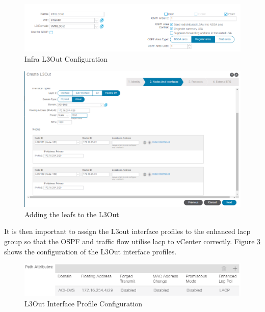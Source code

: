 \begin{figure}[H]
    
    \centering
    \includegraphics[scale=0.6]{images/InfraL3Out.png}
    
    \caption{Infra L3Out Configuration}
    \label{fig:l3out}
\end{figure}

\begin{figure}[H]
    
    \centering
    \includegraphics[scale=0.47]{images/InfraL3OutNodes.png}
    
    \caption{Adding the leafs to the L3Out}
    \label{fig:l3out-nodes}
\end{figure}

It is then important to assign the L3out interface profiles to the enhanced \gls{lacp} group so that the OSPF and traffic flow utilise \gls{lacp} to vCenter correctly. Figure \ref{fig:l3out-lacp} shows the configuration of the L3Out interface profiles.

\begin{figure}[H]
    
    \centering
    \includegraphics[scale=0.8]{images/l3out-lacp.png}
    
    \caption{L3Out Interface Profile Configuration}
    \label{fig:l3out-lacp}
\end{figure}

